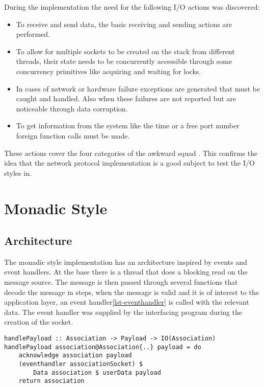 During the implementation the need for the following I/O actions was discovered:

\begin{itemize}

\item To receive and send data, the basic receiving and sending actions are performed.

\item To allow for multiple sockets to be created on the stack from different threads, their state needs to be concurrently accessible through some concurrency primitives like acquiring and waiting for locks.

\item In cases of network or hardware failure exceptions are generated that must be caught and handled. Also when these failures are not reported but are noticeable through data corruption.

\item To get information from the system like the time or a free port number foreign function calls must be made.
\end{itemize}

These actions cover the four categories of the awkward squad \cite{jones_tackling_2009}. 
This confirms the idea that the network protocol implementation is a good subject to test the I/O styles in.
\section{Monadic Style}
\subsection{Architecture}
The monadic style implementation has an architecture inspired by events and event handlers. At the base there is a thread that does a blocking read on the message source. The message is then passed through several functions that decode the message in steps, when the message is valid and it is of interest to the application layer, an event handler\ref{lst-eventhandler} is called with the relevant data. The event handler was supplied by the interfacing program during the creation of the socket.

\begin{lstlisting}[caption={The event handler is called when a payload is received},label={lst-eventhandler}]
handlePayload :: Association -> Payload -> IO(Association)
handlePayload association@Association{..} payload = do 
    acknowledge association payload
    (eventhandler associationSocket) $
	    Data association $ userData payload
    return association
\end{lstlisting}

